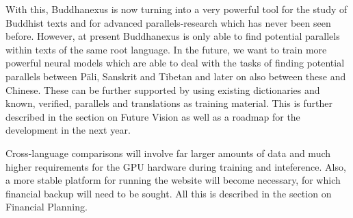With this, Buddhanexus is now turning into a very powerful tool for the study of Buddhist texts and for advanced parallels-research which has never been seen before. However, at present Buddhanexus is only able to find potential parallels within texts of the same root language. In the future, we want to train more powerful neural models which are able to deal with the tasks of finding potential parallels between Pāli, Sanskrit and Tibetan and later on also between these and Chinese. These can be further supported by using existing dictionaries and known, verified, parallels and translations as training material. This is further described in the section on Future Vision as well as a roadmap for the development in the next year.

Cross-language comparisons will involve far larger amounts of data and much higher requirements for the GPU hardware during training and inteference. Also, a more stable platform for running the website will become necessary, for which financial backup will need to be sought. All this is described in the section on Financial Planning.
